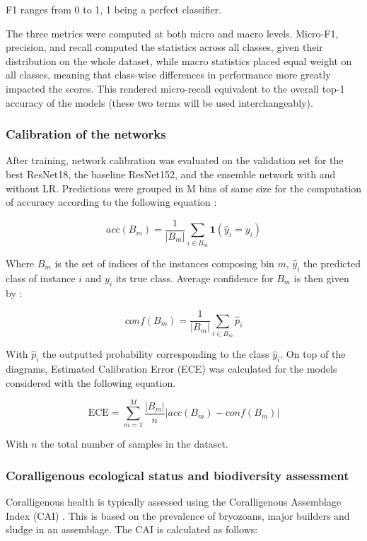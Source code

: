 F1 ranges from 0 to 1, 1 being a perfect classifier.

The three metrics were computed at both micro and macro levels. Micro-F1, precision, and recall computed the statistics across all classes, given their distribution on the whole dataset, while macro statistics placed equal weight on all classes, meaning that class-wise differences in performance more greatly impacted the scores. This rendered micro-recall equivalent to the overall top-1 accuracy of the models (these two terms will be used interchangeably).

\subsubsection{Calibration of the networks}\label{chapitre1_5.2.2}

After training, network calibration was evaluated on the validation set for the best ResNet18, the baseline ResNet152, and the ensemble network with and without LR. Predictions were grouped in M bins of same size for the computation of accuracy according to the following equation \citep{guo_calibration_2017}:

\begin{equation}
	acc(B_m)=\frac{1}{|B_m|}\sum_{i\in B_m}\textbf{1}(\hat{y}_i=y_i)
	\label{eq1.4}
\end{equation}

Where $B_m$ is the set of indices of the instances composing bin $m$, $\hat{y}_i$ the predicted class of instance $i$ and $y_i$ its true class. Average confidence for $B_m$ is then given by :

\begin{equation}
conf(B_m)=\frac{1}{|B_m|}\sum_{i\in B_m}\hat{p}_i
\label{eq1.5}
\end{equation}

With $\hat{p}_i$ the outputted probability corresponding to the class $\hat{y}_i$. On top of the diagrams, Estimated Calibration Error (ECE) was calculated for the models considered with the following equation.

\begin{equation}
\text{ECE}=\sum_{m=1}^{M}\frac{|B_m|}{n}|acc(B_m)-conf(B_m)|
\label{eq1.6}
\end{equation}

With $n$ the total number of samples in the dataset.


\subsubsection{Coralligenous ecological status and biodiversity assessment}\label{chapitre1_5.2.3}
Coralligenous health is typically assessed using the Coralligenous Assemblage Index (CAI) \citep{deter_preliminary_2012}. This is based on the prevalence of bryozoans, major builders and sludge in an assemblage. The CAI is calculated as follows:

